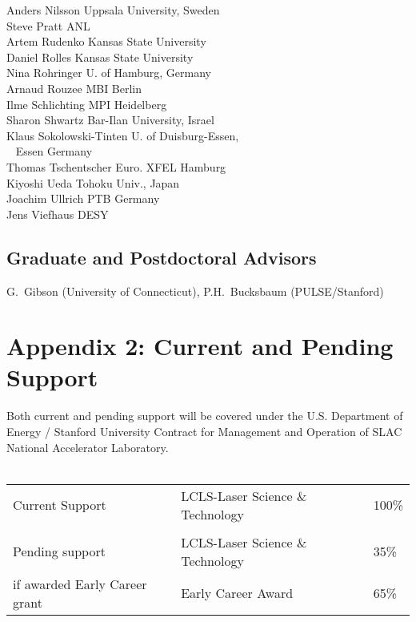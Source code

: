\documentclass[letterpaper,oneside,11pt]{article}
\begin{document}
{\begin{multicols}{2}
	Anders Nilsson \hfill Uppsala University, Sweden\\
	Steve Pratt \hfill ANL\\
	Artem Rudenko \hfill Kansas State University\\
	Daniel Rolles \hfill Kansas State University\\
	Nina Rohringer \hfill U. of Hamburg, Germany\\
	Arnaud Rouzee \hfill MBI Berlin\\
	Ilme Schlichting \hfill MPI Heidelberg\\
	Sharon Shwartz \hfill Bar-Ilan University, Israel\\
	Klaus Sokolowski-Tinten \hfill U. of Duisburg-Essen,\\\mbox{ } \hfill Essen Germany\\
	Thomas Tschentscher \hfill Euro. XFEL Hamburg\\
	Kiyoshi Ueda \hfill Tohoku Univ., Japan\\
	Joachim Ullrich \hfill PTB Germany\\
	Jens Viefhaus \hfill DESY
\end{multicols}
}
\normalsize
\subsection*{Graduate and Postdoctoral Advisors}
G.~Gibson (University of Connecticut), P.H.~Bucksbaum (PULSE/Stanford)


















\clearpage
\appendix
\section*{Appendix 2: Current and Pending Support}
Both current and pending support will be covered under the U.S. Department of Energy / Stanford University Contract for Management and Operation of SLAC National Accelerator Laboratory.\\
\vspace{\baselineskip}\\
\begin{tabular}{lll}
Current Support&LCLS-Laser Science \& Technology & 100\%  \\
		\vspace{2\baselineskip} &&\\
Pending support&LCLS-Laser Science \& Technology & 35\% \\
if awarded Early Career grant &  Early Career Award & 65\% \\
\end{tabular}
\end{document}
